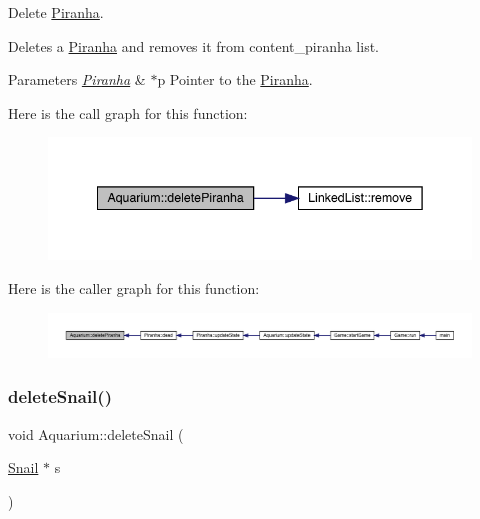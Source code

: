 Delete \mbox{\hyperlink{class_piranha}{Piranha}}. 

Deletes a \mbox{\hyperlink{class_piranha}{Piranha}} and removes it from content\+\_\+piranha list. 
\begin{DoxyParams}{Parameters}
{\em \mbox{\hyperlink{class_piranha}{Piranha}}} & $\ast$p Pointer to the \mbox{\hyperlink{class_piranha}{Piranha}}. \\
\hline
\end{DoxyParams}
Here is the call graph for this function\+:\nopagebreak
\begin{figure}[H]
\begin{center}
\leavevmode
\includegraphics[width=342pt]{class_aquarium_a86cec76f7e0cbbdff79d5cef1e6e7f84_cgraph}
\end{center}
\end{figure}
Here is the caller graph for this function\+:\nopagebreak
\begin{figure}[H]
\begin{center}
\leavevmode
\includegraphics[width=350pt]{class_aquarium_a86cec76f7e0cbbdff79d5cef1e6e7f84_icgraph}
\end{center}
\end{figure}
\mbox{\label{class_aquarium_a08048866266aabb12b8cc82bac042c18}} 
\subsubsection{\texorpdfstring{delete\+Snail()}{deleteSnail()}}
{\footnotesize\ttfamily void Aquarium\+::delete\+Snail (\begin{DoxyParamCaption}\item[{\mbox{\hyperlink{class_snail}{Snail}} $\ast$}]{s }\end{DoxyParamCaption})}



